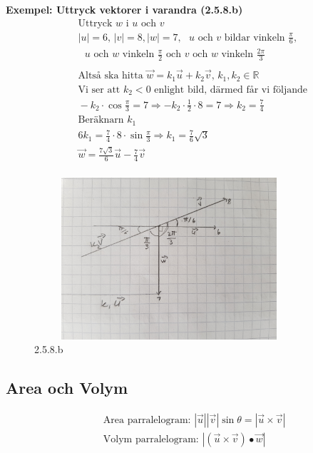 \textbf{Exempel: Uttryck vektorer i varandra (2.5.8.b)}
\begin{align*}
  &\quad  \text{Uttryck $w$ i $u$ och $v$} \\
  &\quad  |u|=6, \, |v|=8, |w|=7, \text{ $u$ och $v$ bildar vinkeln } \frac{\pi}{6}, \\
  &\quad  \text{ $u$ och $w$ vinkeln } \frac{\pi}{2} \text{ och $v$ och $w$ vinkeln } 
  \frac{2\pi}{3}  \\
  &\quad  \\
  &\quad  \text{Altså ska hitta } \vec{w}=k_1\vec{u}+k_2\vec{v}, \, k_1,k_2\in\mathbb{R} \\
  &\quad  \text{Vi ser att $k_2<0$ enlight bild, därmed får vi följande } \\
  &\quad  -k_2\cdot\cos{\frac{\pi}{3}}=7 \Rightarrow -k_2\cdot{\frac{1}{2}}\cdot{8}=7
  \Rightarrow k_2=\frac{7}{4} \\
  &\quad  \text{Beräknarn $k_1$ } \\
  &\quad  6k_1=\frac{7}{4}\cdot{8}\cdot{\sin{\frac{\pi}{3}}} \Rightarrow k_1=\frac{7}{6}\sqrt{3} \\
  &\quad  \vec{w}=\frac{7\sqrt{3}}{6}\vec{u}-\frac{7}{4}\vec{v} \\
\end{align*}
\begin{figure}[h]
    \vspace{10mm}
    \centering
    \includegraphics[width=10cm, height=6cm]{image/2.5.8.b.jpg} 
    \caption{2.5.8.b}
\end{figure}


\newpage

\subsection{Area och Volym}
\begin{align*} 
  &\quad  \text{Area parralelogram: } |\vec{u}||\vec{v}|\sin{\theta} = |\vec{u}\times\vec{v}| \\
  &\quad  \text{Volym parralelogram: } |(\vec{u}\times\vec{v})\bullet\vec{w}|
\end{align*}

